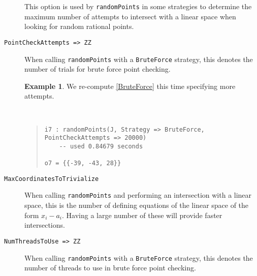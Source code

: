 \documentclass[11pt]{amsart}
\theoremstyle{definition}
\newtheorem{example}{Example}[section]
\begin{document}
\begin{description}
    This option is used by {\tt randomPoints} in some strategies to determine the maximum number of attempts to intersect with a linear space when looking for random rational points.  %

    \item[\tt PointCheckAttempts => ZZ]

    When calling {\tt randomPoints} with a {\tt BruteForce} strategy, this denotes the number of trials for brute force point checking.
    
    \begin{example}
        We re-compute \cref{BruteForce} this time specifying more attempts.
    {{\small\color{blue}
    ~~
    \begin{quote}
\begin{verbatim}    
i7 : randomPoints(J, Strategy => BruteForce, PointCheckAttempts => 20000)
    -- used 0.84679 seconds
    
o7 = {{-39, -43, 28}}
    \end{verbatim}%
\end{quote}\vspace{-1em}%
}}%
    \end{example}%
%
    \item[\tt MaxCoordinatesToTrivialize]

    When calling {\tt randomPoints} and performing an intersection with a linear space, this is the number of defining equations of the linear space of the form $x_i - a_i$.  Having a large number of these will provide faster intersections.
    
    \item[\tt NumThreadsToUse => ZZ]

    When calling {\tt randomPoints} with a {\tt BruteForce} strategy, this denotes the number of threads to use in brute force point checking.
    \end{description}
\end{document}
